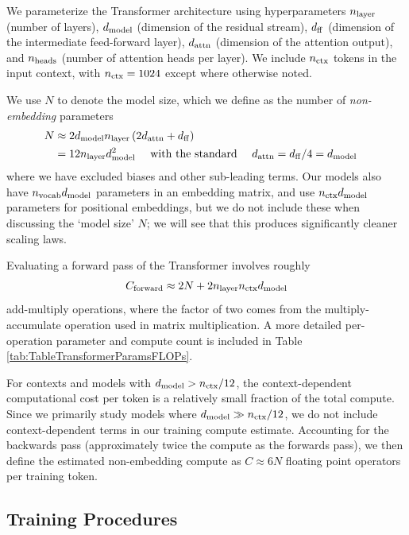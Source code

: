 \documentclass[english]{article}
\newcommand{\be}{\begin{equation}}
\newcommand{\ee}{\end{equation}}
\begin{document}
 We parameterize the Transformer architecture using hyperparameters $n_{\rm layer}$ (number of layers), $d_{{\rm model}}$ (dimension of the residual stream), $d_{\rm ff}$ (dimension of the intermediate feed-forward layer), $d_{\rm attn}$ (dimension of the attention output), and $n_{\rm heads}$ (number of attention heads per layer).  We include $n_{\rm ctx}$ tokens in the input context, with $n_{\rm ctx} = 1024$ except where otherwise noted.

We use $N$ to denote the model size, which we define as the number of \emph{non-embedding} parameters
\begin{align}
\label{eq:ModelSizeDefinition}
N & \approx  2d_{{\rm model}}n_{{\rm layer}}\left(2d_{{\rm attn}}+d_{{\rm ff}}\right) & \nonumber \\
& = 12 n_{\rm layer} d_{{\rm model}}^2 \quad \text{ with the standard } \quad d_{\rm attn} = d_{\rm ff}/4 = d_{{\rm model}} &
\end{align}
where we have excluded biases and other sub-leading terms.
Our models also have $n_{\rm vocab} d_{{\rm model}}$ parameters in an embedding matrix, and use $n_{\rm ctx} d_{{\rm model}}$ parameters for positional embeddings, but we do not include these when discussing the `model size' $N$; we will see that this produces significantly cleaner scaling laws.

Evaluating a forward pass of the Transformer involves roughly
\be
\label{eq:ApproximateTotalCompute}
C_{\rm forward} \approx 2N + 2n_{{\rm layer}}n_{{\rm ctx}}d_{{\rm model}}
\ee
add-multiply operations, where the factor of two comes from the multiply-accumulate operation used in matrix multiplication.  A more detailed per-operation parameter and compute count is included in Table \ref{tab:TableTransformerParamsFLOPs}.

For contexts and models with $d_{{\rm model}} > n_{\rm ctx} / 12$, the context-dependent computational cost per token is a relatively small fraction of the total compute.
Since we primarily study models where $d_{\rm model} \gg n_{\rm ctx}/12$, we do not include context-dependent terms in our training compute estimate.  Accounting for the backwards pass (approximately twice the compute as the forwards pass), we then define the estimated non-embedding compute as $C \approx 6 N$ floating point operators per training token.


\subsection{Training Procedures}
\end{document}
